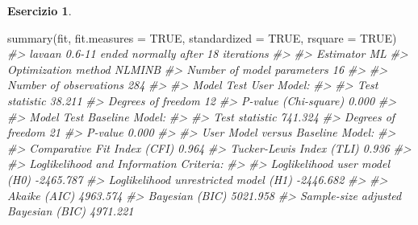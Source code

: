 \documentclass[
  11pt,
]{krantz}
\makeatletter
\newenvironment{Shaded}{\begin{snugshade}}{\end{snugshade}}
\newcommand{\AttributeTok}[1]{\textcolor[rgb]{0.61,0.61,0.61}{#1}}
\newcommand{\CommentTok}[1]{\textcolor[rgb]{0.37,0.37,0.37}{\textit{#1}}}
\newcommand{\ConstantTok}[1]{\textcolor[rgb]{0,0,0}{#1}}
\newcommand{\FunctionTok}[1]{\textcolor[rgb]{0,0,0}{#1}}
\newcommand{\NormalTok}[1]{#1}
\newenvironment{kframe}{%
\medskip{}
\setlength{\fboxsep}{.8em}
 \def\at@end@of@kframe{}%
 \ifinner\ifhmode%
  \def\at@end@of@kframe{\end{minipage}}%
  \begin{minipage}{\columnwidth}%
 \fi\fi%
 \def\FrameCommand##1{\hskip\@totalleftmargin \hskip-\fboxsep
 \colorbox{shadecolor}{##1}\hskip-\fboxsep
     \hskip-\linewidth \hskip-\@totalleftmargin \hskip\columnwidth}%
 \MakeFramed {\advance\hsize-\width
   \@totalleftmargin\z@ \linewidth\hsize
   \@setminipage}}%
 {\par\unskip\endMakeFramed%
 \at@end@of@kframe}
\renewenvironment{Shaded}{\begin{kframe}}{\end{kframe}}
\theoremstyle{definition}
\theoremstyle{definition}
\theoremstyle{definition}
\newtheorem{exercise}{Esercizio}[chapter]
\theoremstyle{definition}
\theoremstyle{remark}
\makeatother
\begin{document}
\begin{exercise}
\begin{Shaded}
\begin{Highlighting}[]
\FunctionTok{summary}\NormalTok{(fit, }\AttributeTok{fit.measures =} \ConstantTok{TRUE}\NormalTok{, }\AttributeTok{standardized =} \ConstantTok{TRUE}\NormalTok{, }\AttributeTok{rsquare =} \ConstantTok{TRUE}\NormalTok{)}
\CommentTok{\#\textgreater{} lavaan 0.6{-}11 ended normally after 18 iterations}
\CommentTok{\#\textgreater{} }
\CommentTok{\#\textgreater{}   Estimator                                         ML}
\CommentTok{\#\textgreater{}   Optimization method                           NLMINB}
\CommentTok{\#\textgreater{}   Number of model parameters                        16}
\CommentTok{\#\textgreater{}                                                       }
\CommentTok{\#\textgreater{}   Number of observations                           284}
\CommentTok{\#\textgreater{}                                                       }
\CommentTok{\#\textgreater{} Model Test User Model:}
\CommentTok{\#\textgreater{}                                                       }
\CommentTok{\#\textgreater{}   Test statistic                                38.211}
\CommentTok{\#\textgreater{}   Degrees of freedom                                12}
\CommentTok{\#\textgreater{}   P{-}value (Chi{-}square)                           0.000}
\CommentTok{\#\textgreater{} }
\CommentTok{\#\textgreater{} Model Test Baseline Model:}
\CommentTok{\#\textgreater{} }
\CommentTok{\#\textgreater{}   Test statistic                               741.324}
\CommentTok{\#\textgreater{}   Degrees of freedom                                21}
\CommentTok{\#\textgreater{}   P{-}value                                        0.000}
\CommentTok{\#\textgreater{} }
\CommentTok{\#\textgreater{} User Model versus Baseline Model:}
\CommentTok{\#\textgreater{} }
\CommentTok{\#\textgreater{}   Comparative Fit Index (CFI)                    0.964}
\CommentTok{\#\textgreater{}   Tucker{-}Lewis Index (TLI)                       0.936}
\CommentTok{\#\textgreater{} }
\CommentTok{\#\textgreater{} Loglikelihood and Information Criteria:}
\CommentTok{\#\textgreater{} }
\CommentTok{\#\textgreater{}   Loglikelihood user model (H0)              {-}2465.787}
\CommentTok{\#\textgreater{}   Loglikelihood unrestricted model (H1)      {-}2446.682}
\CommentTok{\#\textgreater{}                                                       }
\CommentTok{\#\textgreater{}   Akaike (AIC)                                4963.574}
\CommentTok{\#\textgreater{}   Bayesian (BIC)                              5021.958}
\CommentTok{\#\textgreater{}   Sample{-}size adjusted Bayesian (BIC)         4971.221}

\end{Highlighting}
\end{Shaded}
\end{exercise}
\end{document}
